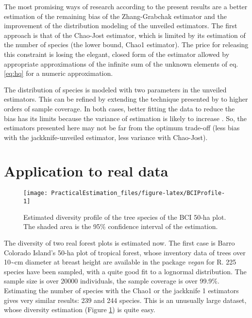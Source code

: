 \documentclass[fleqn,10pt]{latex/stylish_article} %
\begin{document}
The most promising ways of research according to the present results are a better estimation of the remaining bias of the Zhang-Grabchak estimator and the improvement of the distribution modeling of the unveiled estimators.
The first approach is that of the Chao-Jost estimator, which is limited by its estimation of the number of species (the lower bound, Chao1 estimator).
The price for releasing this constraint is losing the elegant, closed form of the estimator allowed by appropriate approximations of the infinite sum of the unknown elements of eq. \eqref{eq:hq} for a numeric approximation.

The distribution of species is modeled with two parameters in the unveiled estimators.
This can be refined by extending the technique presented by \citet{Chao2014c} to higher orders of sample coverage.
In both cases, better fitting the data to reduce the bias has its limits because the variance of estimation is likely to increase \citep{Bonachela2008}.
So, the estimators presented here may not be far from the optimum trade-off (less bias with the jackknife-unveiled estimator, less variance with Chao-Jost).

\hypertarget{application-to-real-data}{%
\section{Application to real data}\label{application-to-real-data}}



\scriptsize

\begin{figure}

{\centering \texttt{[image: PracticalEstimation\_files/figure-latex/BCIProfile-1]} 

}

\caption{Estimated diversity profile of the tree species of the BCI 50-ha plot. The shaded area is the 95\% confidence interval of the estimation.}\label{fig:BCIProfile}
\end{figure}

\normalsize

The diversity of two real forest plots is estimated now.
The first case is Barro Colorado Island's 50-ha plot of tropical forest, whose inventory data of trees over 10\textasciitilde cm diameter at breast height are available in the package \emph{vegan} \citep{Oksanen2012} for R.
225 species have been sampled, with a quite good fit to a lognormal distribution.
The sample size is over 20000 individuals, the sample coverage is over 99.9\%.
Estimating the number of species with the Chao1 or the jackknife 1 estimators gives very similar results: 239 and 244 species.
This is an unusually large dataset, whose diversity estimation (Figure \ref{fig:BCIProfile}) is quite easy.
\end{document}
